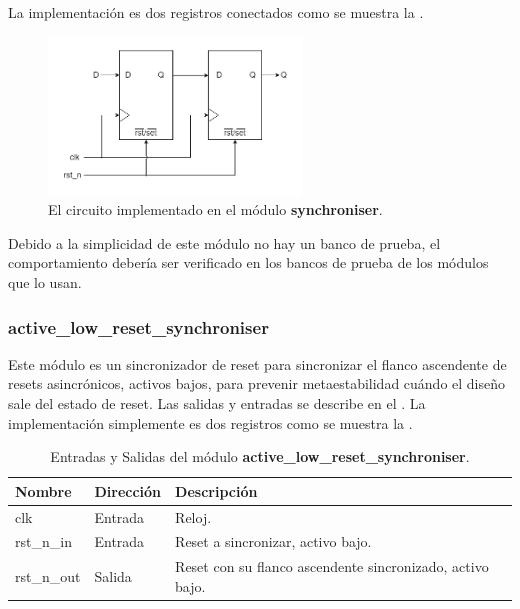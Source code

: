 \documentclass[a4paper, twoside, 11pt]{report}
\begin{document}
La implementación es dos registros conectados como se muestra la .

\begin{figure}[htb]
  \centering
  \includegraphics[width=0.6\textwidth]{./img/synchroniser.drawio}
  \caption{El circuito implementado en el módulo \textbf{synchroniser}.}
  \label{fig:synchroniser}
\end{figure}

Debido a la simplicidad de este módulo no hay un banco de prueba, el comportamiento debería ser verificado en los bancos de prueba de los módulos que lo usan.

\FloatBarrier
\subsubsection{active\_low\_reset\_synchroniser}

Este módulo es un sincronizador de reset para sincronizar el flanco ascendente de resets asincrónicos, activos bajos, para prevenir metaestabilidad cuándo el diseño sale del estado de reset. Las salidas y entradas se describe en el . La implementación simplemente es dos registros como se muestra la .

\begin{table}[htb]
  \centering
  \tablezebra
  \begin{tabulary}{\linewidth}{l|l|L}
    \setcounter{rownum}{0}
    \textbf{Nombre}&\textbf{Dirección}&\textbf{Descripción} \\
    \hline
    clk&Entrada&Reloj. \\
    rst\_n\_in&Entrada&Reset a sincronizar, activo bajo. \\
    rst\_n\_out&Salida&Reset con su flanco ascendente sincronizado, activo bajo. \\
  \end{tabulary}
  \caption{Entradas y Salidas del módulo \textbf{active\_low\_reset\_synchroniser}.}
  \label{tab:ports_active_low_reset_synchroniser}
\end{table}
\end{document}
